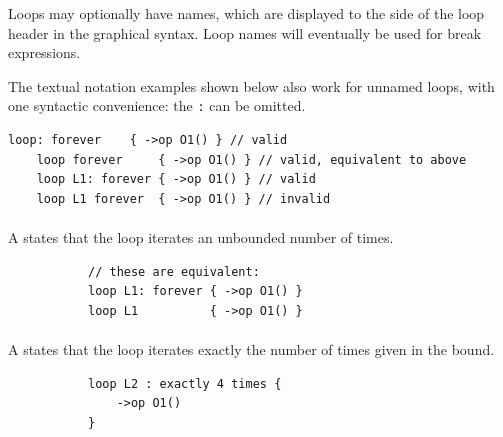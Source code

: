 Loops may optionally have names, which are displayed to the side of
the loop header in the graphical syntax.  Loop names will eventually
be used for break expressions.

\begin{remark}
  The textual notation examples shown below also work for unnamed
  loops, with one syntactic convenience: the \texttt{:} can be
  omitted.
  \begin{lstlisting}[language=RoboCert]
    loop: forever    { ->op O1() } // valid
    loop forever     { ->op O1() } // valid, equivalent to above
    loop L1: forever { ->op O1() } // valid
    loop L1 forever  { ->op O1() } // invalid
  \end{lstlisting}
\end{remark}

\paragraph{\minfiniteloopbound}
A \minfiniteloopbound{} states that the loop iterates an unbounded
number of times.

\begin{figure}[H]
\begin{subfigure}[t]{\egtextwidth}
\begin{lstlisting}[style=Example]
// these are equivalent:
loop L1: forever { ->op O1() }
loop L1          { ->op O1() }
\end{lstlisting}
\end{subfigure}
\hfill
\begin{subfigure}[t]{\eggraphicalwidth}
  \gsecaption
  \centering
\end{subfigure}
\end{figure}

\paragraph{\mdefiniteloopbound}
A \mdefiniteloopbound{} states that the loop iterates exactly the
number of times given in the bound.

\begin{figure}[H]
\begin{subfigure}[t]{\egtextwidth}
\begin{lstlisting}[style=Example]
loop L2 : exactly 4 times {
    ->op O1()
}
\end{lstlisting}
\end{subfigure}
\hfill
\begin{subfigure}[t]{\eggraphicalwidth}
  \gsecaption
  \centering
\end{subfigure}
\end{figure}


